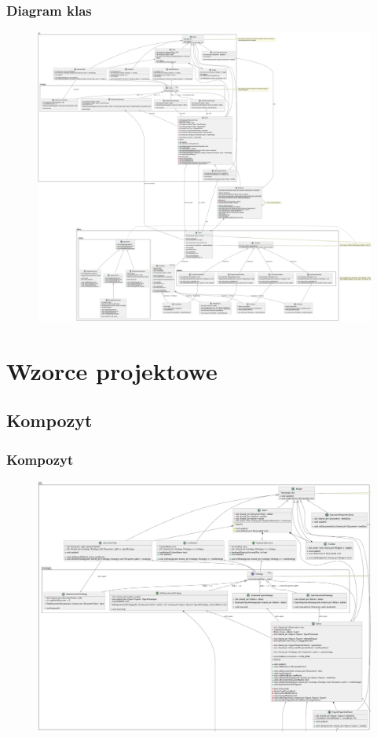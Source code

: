 \documentclass[
	11pt,]{beamer}
\begin{document}
\begin{frame}
	\frametitle{Diagram klas}
	
	\begin{figure}
		\includegraphics[height=0.7\textheight]{figures/class_diagram.png}
	\end{figure}
\end{frame}


\section{Wzorce projektowe}

\subsection{Kompozyt}

\begin{frame}
	\frametitle{Kompozyt}
	
	\begin{figure}
		\includegraphics[height=0.7\textheight]{figures/kompozyt.png}
	\end{figure}
\end{frame}
\end{document}
